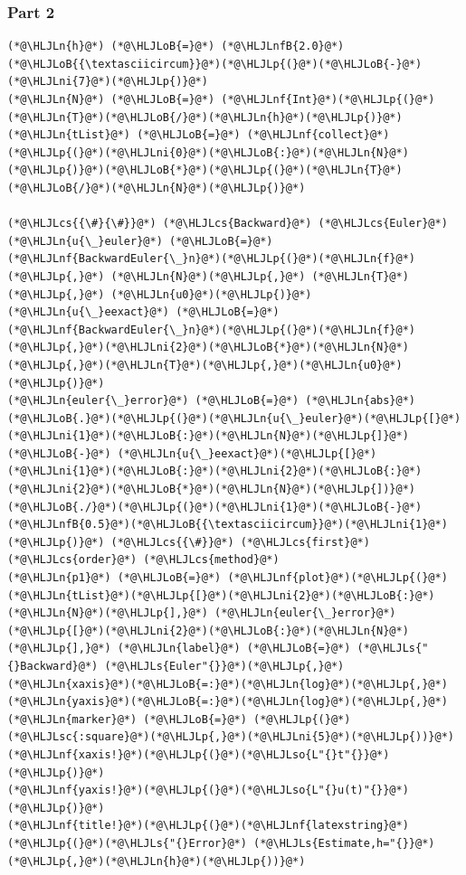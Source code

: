 \documentclass[12pt,a4paper]{article}
\newcommand{\HLJLn}[1]{#1}
\newcommand{\HLJLnf}[1]{\textcolor[RGB]{66,102,213}{#1}}
\newcommand{\HLJLs}[1]{\textcolor[RGB]{201,61,57}{#1}}
\newcommand{\HLJLsc}[1]{\textcolor[RGB]{201,61,57}{#1}}
\newcommand{\HLJLso}[1]{\textcolor[RGB]{201,61,57}{#1}}
\newcommand{\HLJLnfB}[1]{\textcolor[RGB]{59,151,46}{#1}}
\newcommand{\HLJLni}[1]{\textcolor[RGB]{59,151,46}{#1}}
\newcommand{\HLJLoB}[1]{\textcolor[RGB]{102,102,102}{\textbf{#1}}}
\newcommand{\HLJLp}[1]{#1}
\newcommand{\HLJLcs}[1]{\textcolor[RGB]{153,153,119}{\textit{#1}}}
\begin{document}
\subsubsection{Part 2}

\begin{lstlisting}
(*@\HLJLn{h}@*) (*@\HLJLoB{=}@*) (*@\HLJLnfB{2.0}@*)(*@\HLJLoB{{\textasciicircum}}@*)(*@\HLJLp{(}@*)(*@\HLJLoB{-}@*)(*@\HLJLni{7}@*)(*@\HLJLp{)}@*)
(*@\HLJLn{N}@*) (*@\HLJLoB{=}@*) (*@\HLJLnf{Int}@*)(*@\HLJLp{(}@*)(*@\HLJLn{T}@*)(*@\HLJLoB{/}@*)(*@\HLJLn{h}@*)(*@\HLJLp{)}@*)
(*@\HLJLn{tList}@*) (*@\HLJLoB{=}@*) (*@\HLJLnf{collect}@*)(*@\HLJLp{(}@*)(*@\HLJLni{0}@*)(*@\HLJLoB{:}@*)(*@\HLJLn{N}@*)(*@\HLJLp{)}@*)(*@\HLJLoB{*}@*)(*@\HLJLp{(}@*)(*@\HLJLn{T}@*)(*@\HLJLoB{/}@*)(*@\HLJLn{N}@*)(*@\HLJLp{)}@*)

(*@\HLJLcs{{\#}{\#}}@*) (*@\HLJLcs{Backward}@*) (*@\HLJLcs{Euler}@*)
(*@\HLJLn{u{\_}euler}@*) (*@\HLJLoB{=}@*) (*@\HLJLnf{BackwardEuler{\_}n}@*)(*@\HLJLp{(}@*)(*@\HLJLn{f}@*)(*@\HLJLp{,}@*) (*@\HLJLn{N}@*)(*@\HLJLp{,}@*) (*@\HLJLn{T}@*)(*@\HLJLp{,}@*) (*@\HLJLn{u0}@*)(*@\HLJLp{)}@*)
(*@\HLJLn{u{\_}eexact}@*) (*@\HLJLoB{=}@*) (*@\HLJLnf{BackwardEuler{\_}n}@*)(*@\HLJLp{(}@*)(*@\HLJLn{f}@*)(*@\HLJLp{,}@*)(*@\HLJLni{2}@*)(*@\HLJLoB{*}@*)(*@\HLJLn{N}@*)(*@\HLJLp{,}@*)(*@\HLJLn{T}@*)(*@\HLJLp{,}@*)(*@\HLJLn{u0}@*)(*@\HLJLp{)}@*)
(*@\HLJLn{euler{\_}error}@*) (*@\HLJLoB{=}@*) (*@\HLJLn{abs}@*)(*@\HLJLoB{.}@*)(*@\HLJLp{(}@*)(*@\HLJLn{u{\_}euler}@*)(*@\HLJLp{[}@*)(*@\HLJLni{1}@*)(*@\HLJLoB{:}@*)(*@\HLJLn{N}@*)(*@\HLJLp{]}@*) (*@\HLJLoB{-}@*) (*@\HLJLn{u{\_}eexact}@*)(*@\HLJLp{[}@*)(*@\HLJLni{1}@*)(*@\HLJLoB{:}@*)(*@\HLJLni{2}@*)(*@\HLJLoB{:}@*)(*@\HLJLni{2}@*)(*@\HLJLoB{*}@*)(*@\HLJLn{N}@*)(*@\HLJLp{])}@*)(*@\HLJLoB{./}@*)(*@\HLJLp{(}@*)(*@\HLJLni{1}@*)(*@\HLJLoB{-}@*)(*@\HLJLnfB{0.5}@*)(*@\HLJLoB{{\textasciicircum}}@*)(*@\HLJLni{1}@*)(*@\HLJLp{)}@*) (*@\HLJLcs{{\#}}@*) (*@\HLJLcs{first}@*) (*@\HLJLcs{order}@*) (*@\HLJLcs{method}@*)
(*@\HLJLn{p1}@*) (*@\HLJLoB{=}@*) (*@\HLJLnf{plot}@*)(*@\HLJLp{(}@*)(*@\HLJLn{tList}@*)(*@\HLJLp{[}@*)(*@\HLJLni{2}@*)(*@\HLJLoB{:}@*)(*@\HLJLn{N}@*)(*@\HLJLp{],}@*) (*@\HLJLn{euler{\_}error}@*)(*@\HLJLp{[}@*)(*@\HLJLni{2}@*)(*@\HLJLoB{:}@*)(*@\HLJLn{N}@*)(*@\HLJLp{],}@*) (*@\HLJLn{label}@*) (*@\HLJLoB{=}@*) (*@\HLJLs{"{}Backward}@*) (*@\HLJLs{Euler"{}}@*)(*@\HLJLp{,}@*) (*@\HLJLn{xaxis}@*)(*@\HLJLoB{=:}@*)(*@\HLJLn{log}@*)(*@\HLJLp{,}@*) (*@\HLJLn{yaxis}@*)(*@\HLJLoB{=:}@*)(*@\HLJLn{log}@*)(*@\HLJLp{,}@*) (*@\HLJLn{marker}@*) (*@\HLJLoB{=}@*) (*@\HLJLp{(}@*)(*@\HLJLsc{:square}@*)(*@\HLJLp{,}@*)(*@\HLJLni{5}@*)(*@\HLJLp{))}@*)
(*@\HLJLnf{xaxis!}@*)(*@\HLJLp{(}@*)(*@\HLJLso{L"{}t"{}}@*)(*@\HLJLp{)}@*)
(*@\HLJLnf{yaxis!}@*)(*@\HLJLp{(}@*)(*@\HLJLso{L"{}u(t)"{}}@*)(*@\HLJLp{)}@*)
(*@\HLJLnf{title!}@*)(*@\HLJLp{(}@*)(*@\HLJLnf{latexstring}@*)(*@\HLJLp{(}@*)(*@\HLJLs{"{}Error}@*) (*@\HLJLs{Estimate,h="{}}@*)(*@\HLJLp{,}@*)(*@\HLJLn{h}@*)(*@\HLJLp{))}@*)


\end{lstlisting}
\end{document}
